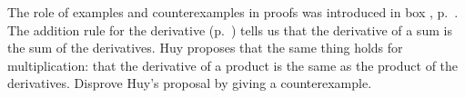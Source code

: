 The role of examples and counterexamples in proofs was introduced in
box , p.~\pageref{fig:proof-not-by-example}.
The addition rule for the derivative (p.~\pageref{properties-of-derivative})
tells us that the derivative of a sum is the sum of the derivatives.
Huy proposes that the same thing holds for multiplication:
that the derivative of a product is the same as the product of
the derivatives. Disprove Huy's proposal by giving a counterexample.
